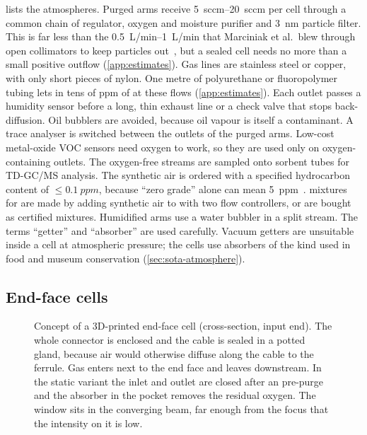  lists the atmospheres. Purged arms receive \SIrange{5}{20}{sccm} per cell through a
common chain of regulator, oxygen and moisture purifier and \SI{3}{nm} particle filter. This is far less
than the \SIrange{0.5}{1}{L/min} that Marciniak et al.\ blew through open collimators to keep particles
out~\cite{Marciniak2017}, but a sealed cell needs no more than a small positive outflow (\cref{app:estimates}).
Gas lines are stainless steel or copper, with only short pieces of nylon. One metre of polyurethane or
fluoropolymer tubing lets in tens of ppm of \Oxy{} at these flows (\cref{app:estimates}). Each outlet passes
a humidity sensor before a long, thin exhaust line or a check valve that stops back-diffusion. Oil
bubblers are avoided, because oil vapour is itself a contaminant. A trace \Oxy{} analyser is switched
between the outlets of the purged arms. Low-cost metal-oxide VOC sensors need oxygen to work, so they
are used only on oxygen-containing outlets. The oxygen-free streams are sampled onto sorbent tubes for
TD-GC/MS analysis. The synthetic air is ordered with a specified hydrocarbon content of
$\leq\SI{0.1}{ppm}$, because ``zero grade'' alone can mean \SI{5}{ppm}~\cite{BOCzero}. \Oxy{} mixtures for
 are made by adding synthetic air to \Ntwo{} with two flow controllers, or are bought as
certified mixtures. Humidified arms use a water bubbler in a split stream. The terms ``getter'' and
``absorber'' are used carefully. Vacuum getters are unsuitable inside a cell at atmospheric pressure; the
cells use absorbers of the kind used in food and museum conservation (\cref{sec:sota-atmosphere}).

\subsection{End-face cells}\label{sec:cells}
\begin{figure}[tbp]
  \centering
  
  \caption{Concept of a 3D-printed end-face cell (cross-section, input end). The whole connector is
  enclosed and the cable is sealed in a potted gland, because air would otherwise diffuse along the cable
  to the ferrule. Gas enters next to the end face and leaves downstream. In the static variant the inlet
  and outlet are closed after an \Ntwo{} pre-purge and the absorber in the pocket removes the residual
  oxygen. The window sits in the converging beam, far enough from the focus that the intensity on it is
  low.}
  \label{fig:cell}
\end{figure}

